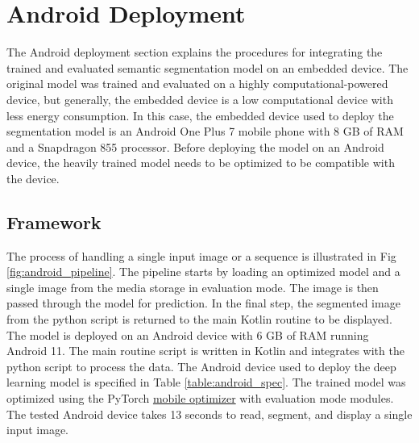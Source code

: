 

    \chapter{Android Deployment}
	\label{chap:androiddeploy}
	
	The Android deployment section explains the procedures for integrating the trained and evaluated semantic segmentation model on an embedded device. The original model was trained and evaluated on a highly computational-powered device, but generally, the embedded device is a low computational device with less energy consumption. In this case, the embedded device used to deploy the segmentation model is an Android One Plus 7 mobile phone with 8 GB of RAM and a Snapdragon 855 processor. Before deploying the model on an Android device, the heavily trained model needs to be optimized to be compatible with the device.    
	
    \section{Framework}
	
	The process of handling a single input image or a sequence is illustrated in Fig \ref{fig:android_pipeline}. The pipeline starts by loading an optimized model and a single image from the media storage in evaluation mode. The image is then passed through the model for prediction. In the final step, the segmented image from the python script is returned to the main Kotlin routine to be displayed. The model is deployed on an Android device with 6 GB of RAM running Android 11. The main routine script is written in Kotlin and integrates with the python script to process the data. The Android device used to deploy the deep learning model is specified in Table \ref{table:android_spec}. The trained model was optimized using the PyTorch \href{https://pytorch.org/docs/stable/mobile_optimizer.html}{\color{teal}mobile optimizer} with evaluation mode modules. The tested Android device takes 13 seconds to read, segment, and display a single input image.
	
